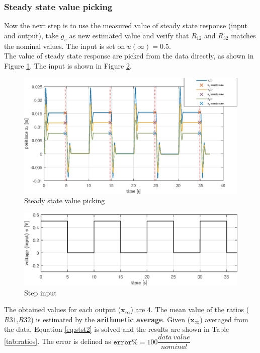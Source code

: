 \documentclass[twosided,a4paper]{article}           %
\begin{document}
\subsubsection{Steady state value picking}
Now the next step is to use the measured value of steady state response (input and output), take $g_v$ as new estimated value and verify that $R_{12}$ and $R_{32}$ matches the nominal values. The input is set on $u(\infty) = 0.5$.\\
The value of steady state response are picked from the data directly, as shown in Figure \ref{fig:stst1}. The input is shown in Figure \ref{fig:step_input}.
\begin{figure}[H]
	\centering
	\includegraphics[width=\linewidth]{img/stst1}
	\caption[steady state value picking]{Steady state value picking}
	\label{fig:stst1}
\end{figure}
\begin{figure}[H]
	\centering
	\includegraphics[width=\linewidth]{img/step_input}
	\caption{Step input}
	\label{fig:step_input}
\end{figure}
\noindent
The obtained values for each output ($\bm x_{\infty}$) are $4$. The mean value of the ratios ($R31$,$R32$) is estimated by the \textbf{arithmetic average}. Given ($ \bm x_{\infty}$) averaged from the data, Equation \ref{eq:stst2} is solved and the results are shown in Table \ref{tab:ratios}. The error is defined as $\texttt{error}\% = 100\dfrac{data \ value}{nominal}$
\end{document}
